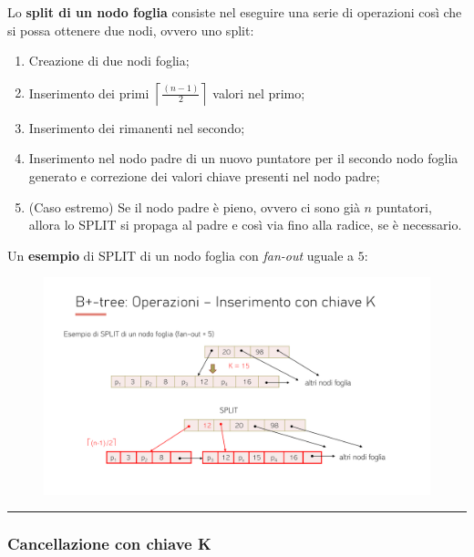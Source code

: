\documentclass[a4paper]{article}
\newcommand{\longline}{\noindent\rule{\textwidth}{0.4pt}}
\begin{document}
	\noindent
	Lo \textcolor{Red3}{\textbf{split di un nodo foglia}} consiste nel eseguire una serie di operazioni così che si possa ottenere due nodi, ovvero uno split:
	\begin{enumerate}
		\item Creazione di due nodi foglia;
		\item Inserimento dei primi $\left\lceil \frac{\left(n-1\right)}{2} \right\rceil$ valori nel primo;
		\item Inserimento dei rimanenti nel secondo;
		\item Inserimento nel nodo padre di un nuovo puntatore per il secondo nodo foglia generato e correzione dei valori chiave presenti nel nodo padre;
		\item (Caso estremo) Se il nodo padre è pieno, ovvero ci sono già $n$ puntatori, allora lo SPLIT si propaga al padre e così via fino alla radice, se è necessario.
	\end{enumerate}\newpage
	
	\noindent
	Un \textcolor{Green4}{\textbf{esempio}} di SPLIT di un nodo foglia con \emph{fan-out} uguale a $5$:
	\begin{figure}[!htp]
		\centering
		\includegraphics[width=\textwidth]{img/inserimento-2.pdf}
	\end{figure}

	\longline
	
	\subsubsection{Cancellazione con chiave K}
	
\end{document}
